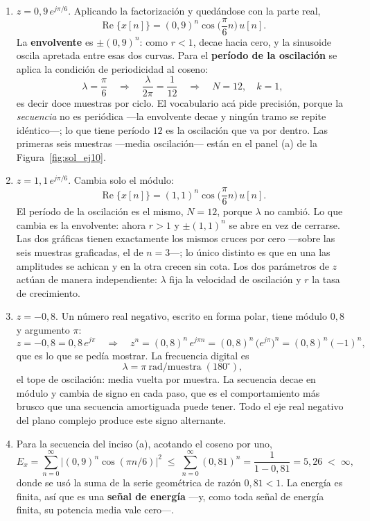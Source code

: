 \documentclass[10pt,a4paper]{article}
\begin{document}
	\begin{enumerate}
		\item $z=0{,}9\,e^{j\pi/6}$. Aplicando la factorización y quedándose con la
		parte real,
		\[
			\boxed{\;\operatorname{Re}\{x[n]\} = (0{,}9)^n\cos\!\Big(\frac{\pi}{6}n\Big)\,u[n].\;}
		\]
		La \textbf{envolvente} es $\pm(0{,}9)^n$: como $r<1$, decae hacia cero, y la sinusoide
		oscila apretada entre esas dos curvas. Para el \textbf{período de la oscilación} se
		aplica la condición de periodicidad al coseno:
		\[
			\lambda = \frac{\pi}{6}
			\quad\Longrightarrow\quad
			\frac{\lambda}{2\pi} = \frac{1}{12}
			\quad\Longrightarrow\quad
			N = 12,\quad k=1,
		\]
		es decir doce muestras por ciclo. El vocabulario acá pide precisión, porque la
		\emph{secuencia} no es periódica ---la envolvente decae y ningún tramo se repite
		idéntico---; lo que tiene período $12$ es la oscilación que va por dentro. Las primeras
		seis muestras ---media oscilación--- están en el panel (a) de la
		Figura~\ref{fig:sol_ej10}.

		\item $z=1{,}1\,e^{j\pi/6}$. Cambia solo el módulo:
		\[
			\operatorname{Re}\{x[n]\} = (1{,}1)^n\cos\!\Big(\frac{\pi}{6}n\Big)\,u[n].
		\]
		El período de la oscilación es el mismo, $N=12$, porque $\lambda$ no cambió. Lo que
		cambia es la envolvente: ahora $r>1$ y $\pm(1{,}1)^n$ se abre en vez de cerrarse. Las
		dos gráficas tienen exactamente los mismos cruces por cero ---sobre las seis muestras
		graficadas, el de $n=3$---; lo único distinto es que en una las amplitudes se achican y
		en la otra crecen sin cota. Los dos parámetros de $z$ actúan de
		manera independiente: $\lambda$ fija la velocidad de oscilación y $r$ la tasa de
		crecimiento.

		\item $z=-0{,}8$. Un número real negativo, escrito en forma polar, tiene módulo
		$0{,}8$ y argumento $\pi$:
		\[
			z = -0{,}8 = 0{,}8\,e^{j\pi}
			\quad\Longrightarrow\quad
			z^n = (0{,}8)^n\,e^{j\pi n} = (0{,}8)^n\,\big(e^{j\pi}\big)^n = (0{,}8)^n(-1)^n,
		\]
		que es lo que se pedía mostrar. La frecuencia digital es
		\[
			\boxed{\;\lambda = \pi\ \text{rad/muestra}\;(180^\circ),\;}
		\]
		el tope de oscilación: media vuelta por muestra. La secuencia decae en módulo y cambia
		de signo en cada paso, que es el comportamiento más brusco que una secuencia
		amortiguada puede tener. Todo el eje real negativo del plano complejo produce este
		signo alternante.

		\item Para la secuencia del inciso (a), acotando el coseno
		por uno,
		\[
			E_x = \sum_{n=0}^{\infty}\big|(0{,}9)^n\cos(\pi n/6)\big|^2
			    \;\leq\; \sum_{n=0}^{\infty}(0{,}81)^n
			    = \frac{1}{1-0{,}81} = 5{,}26 \;<\; \infty,
		\]
		donde se usó la suma de la serie geométrica de razón $0{,}81<1$. La energía es finita,
		así que es una \textbf{señal de energía} ---y, como toda señal de energía finita, su
		potencia media vale cero---.


\end{enumerate}
\end{document}

